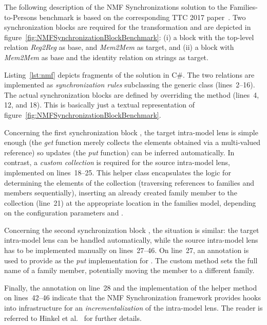 The following description of the NMF Synchronizations solution to the Families-to-Persons benchmark is based on the corresponding TTC 2017 paper~\cite{Hinkel2017}.
Two synchronization blocks are required for the transformation and are depicted in figure~\ref{fig:NMFSynchronizationBlockBenchmark}:  (i) a block with the top-level relation \emph{Reg2Reg} as base, and \emph{Mem2Mem} as target, and (ii) a block with \emph{Mem2Mem} as base and the identity relation on strings as target.

Listing~\ref{lst:nmf} depicts fragments of the solution in C\#.
The two relations are implemented as \emph{synchronization rules} subclassing the generic class  (lines~2--16).
The actual synchronization blocks are defined by overriding the method  (lines~4, 12, and 18).
This is basically just a textual representation of figure~\ref{fig:NMFSynchronizationBlockBenchmark}.

Concerning the first synchronization block , the target intra-model lens  is simple enough (the \emph{get} function merely collects the elements obtained via a multi-valued reference) so updates (the \emph{put} function) can be inferred automatically.  
In contrast, a \emph{custom collection}  is required for the source intra-model lens, implemented on lines~18--25.
This helper class encapsulates the logic for determining the elements of the collection (traversing references to families and members sequentially), inserting an already created family member to the collection (line~21) at the appropriate location in the families model, depending on the configuration parameters  and . 

Concerning the second synchronization block , the situation is similar:  the target intra-model lens  can be handled automatically, while the source intra-model lens  has to be implemented manually on lines~27--46.
On line~27, an  annotation is used to provide  as the \emph{put} implementation for .
The custom method  sets the full name of a family member, potentially moving the member to a different family.

Finally, the annotation on line~28 and the implementation of the helper method  on lines~42--46 indicate that the NMF Synchronization framework provides hooks into infrastructure for an \emph{incrementalization} of the intra-model lens.
The reader is referred to Hinkel et al.~\cite{SoSyM2017-Hinkel} for further details.

